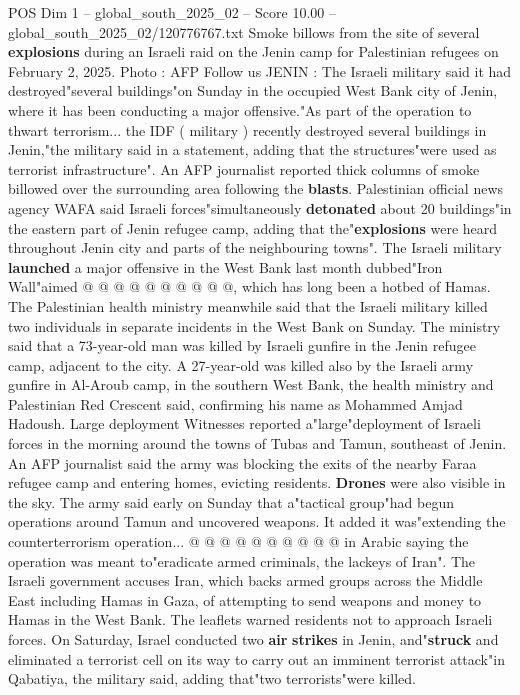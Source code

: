 \begin{textsample}{POS Dim 1 – global\_south\_2025\_02 – Score 10.00 – global\_south\_2025\_02/120776767.txt}  \label{ex:f1_pos_366}
Smoke billows from the site of several \textbf{explosions} during an Israeli raid on the Jenin camp for Palestinian refugees on February 2, 2025.
Photo : AFP Follow us JENIN : The Israeli military said it had destroyed"several buildings"on Sunday in the occupied West Bank city of Jenin, where it has been conducting a major offensive."As part of the operation to thwart terrorism... the IDF ( military ) recently destroyed several buildings in Jenin,"the military said in a statement, adding that the structures"were used as terrorist infrastructure".
An AFP journalist reported thick columns of smoke billowed over the surrounding area following the \textbf{blasts}.
Palestinian official news agency WAFA said Israeli forces"simultaneously \textbf{detonated} about 20 buildings"in the eastern part of Jenin refugee camp, adding that the"\textbf{explosions} were heard throughout Jenin city and parts of the neighbouring towns".
The Israeli military \textbf{launched} a major offensive in the West Bank last month dubbed"Iron Wall"aimed @ @ @ @ @ @ @ @ @ @, which has long been a hotbed of Hamas.
The Palestinian health ministry meanwhile said that the Israeli military killed two individuals in separate incidents in the West Bank on Sunday.
The ministry said that a 73-year-old man was killed by Israeli gunfire in the Jenin refugee camp, adjacent to the city.
A 27-year-old was killed also by the Israeli army gunfire in Al-Aroub camp, in the southern West Bank, the health ministry and Palestinian Red Crescent said, confirming his name as Mohammed Amjad Hadoush.
Large deployment Witnesses reported a"large"deployment of Israeli forces in the morning around the towns of Tubas and Tamun, southeast of Jenin.
An AFP journalist said the army was blocking the exits of the nearby Faraa refugee camp and entering homes, evicting residents. \textbf{Drones} were also visible in the sky.
The army said early on Sunday that a"tactical group"had begun operations around Tamun and uncovered weapons.
It added it was"extending the counterterrorism operation... @ @ @ @ @ @ @ @ @ @ in Arabic saying the operation was meant to"eradicate armed criminals, the lackeys of Iran".
The Israeli government accuses Iran, which backs armed groups across the Middle East including Hamas in Gaza, of attempting to send weapons and money to Hamas in the West Bank.
The leaflets warned residents not to approach Israeli forces.
On Saturday, Israel conducted two \textbf{air} \textbf{strikes} in Jenin, and"\textbf{struck} and eliminated a terrorist cell on its way to carry out an imminent terrorist attack"in Qabatiya, the military said, adding that"two terrorists"were killed.

\end{textsample}
